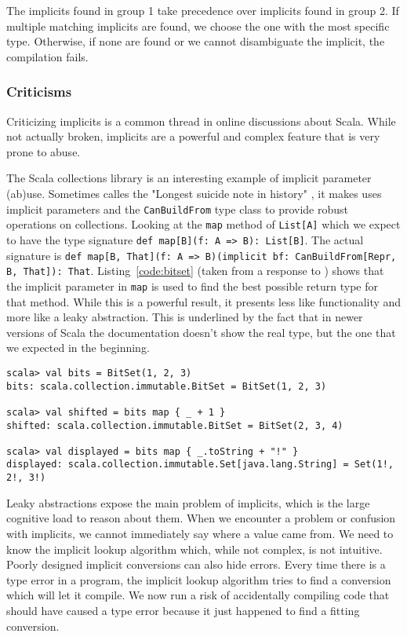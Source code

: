 The implicits found in group 1 take precedence over implicits found in group 2. If multiple matching implicits are found, we choose the one with the most specific type. Otherwise, if none are found or we cannot disambiguate the implicit, the compilation fails.
        
\subsubsection{Criticisms}

Criticizing implicits is a common thread in online discussions about Scala. While not actually broken, implicits are a powerful and complex feature that is very prone to abuse.

The Scala collections library is an interesting example of implicit parameter (ab)use. Sometimes calles the "Longest suicide note in history" \autocite{lakes:2009}, it makes uses implicit parameters and the \texttt{CanBuildFrom} type class to provide robust operations on collections. Looking at the \texttt{map} method of \texttt{List[A]} which we expect to have the type signature \texttt{def map[B](f: A => B): List[B]}. The actual signature is \texttt{def map[B, That](f: A => B)(implicit bf: CanBuildFrom[Repr, B, That]): That}. Listing~\ref{code:bitset} (taken from a response to \autocite{lakes:2009}) shows that the implicit parameter in \texttt{map} is used to find the best possible return type for that method. While this is a powerful result, it presents less like functionality and more like a leaky abstraction. This is underlined by the fact that in newer versions of Scala the documentation doesn't show the real type, but the one that we expected in the beginning.

\begin{lstlisting}[caption=Bitset example, label=code:bitset]
scala> val bits = BitSet(1, 2, 3)
bits: scala.collection.immutable.BitSet = BitSet(1, 2, 3)

scala> val shifted = bits map { _ + 1 }
shifted: scala.collection.immutable.BitSet = BitSet(2, 3, 4)

scala> val displayed = bits map { _.toString + "!" }
displayed: scala.collection.immutable.Set[java.lang.String] = Set(1!, 2!, 3!)
\end{lstlisting}

Leaky abstractions expose the main problem of implicits, which is the large cognitive load to reason about them. When we encounter a problem or confusion with implicits, we cannot immediately say where a value came from. We need to know the implicit lookup algorithm which, while not complex, is not intuitive. Poorly designed implicit conversions can also hide errors. Every time there is a type error in a program, the implicit lookup algorithm tries to find a conversion which will let it compile. We now run a risk of accidentally compiling code that should have caused a type error because it just happened to find a fitting conversion.

